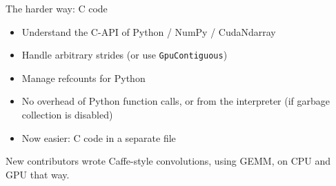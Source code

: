 \documentclass[a4paper,9pt]{beamer}
\begin{document}
\begin{frame}[fragile]{The harder way: C code}
  \begin{itemize}
    \item Understand the C-API of Python / NumPy / CudaNdarray
    \item Handle arbitrary strides (or use \verb|GpuContiguous|)
    \item Manage refcounts for Python
    \item No overhead of Python function calls, or from the interpreter (if garbage
      collection is disabled)
    \item Now easier: C code in a separate file
  \end{itemize}
  New contributors wrote Caffe-style convolutions, using GEMM, on CPU and GPU that way.
\end{frame}
\end{document}
